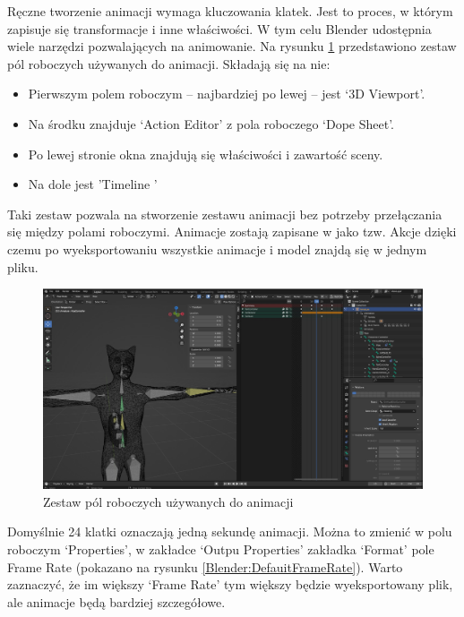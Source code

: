 \documentclass[12pt,twoside]{article}
\begin{document}
Ręczne tworzenie animacji wymaga kluczowania klatek. Jest to proces, w którym
zapisuje się transformacje i inne właściwości. W tym celu Blender udostępnia wiele narzędzi
pozwalających na animowanie. Na rysunku
\ref{Blender:DefaulAnimationWin} przedstawiono zestaw pól roboczych używanych do
animacji. Składają się na nie: 
\begin{itemize}
\item Pierwszym polem roboczym -- najbardziej po lewej --  jest `3D Viewport'. 
\item Na środku znajduje `Action Editor' z pola roboczego `Dope Sheet'.
\item Po lewej stronie okna znajdują się właściwości i zawartość sceny.
\item Na dole jest 'Timeline '
\end{itemize}
Taki zestaw pozwala na stworzenie zestawu animacji bez potrzeby przełączania się
między polami roboczymi. Animacje zostają zapisane w jako tzw. Akcje dzięki
czemu po wyeksportowaniu wszystkie animacje i model znajdą się w jednym pliku.

\begin{figure}[ht!]
    \centering
    \includegraphics[width=12cm]{BlenderPict/WindowForAnimation.jpg}
    \caption{Zestaw pól roboczych używanych do animacji}
    \label{Blender:DefaulAnimationWin}
\end{figure}


Domyślnie 24 klatki oznaczają jedną sekundę animacji. Można to zmienić w polu
roboczym `Properties', w zakładce `Outpu Properties' zakładka `Format' pole
Frame Rate (pokazano na rysunku \ref{Blender:DefauitFrameRate}). Warto
zaznaczyć, że im większy `Frame Rate' tym większy będzie wyeksportowany plik,
ale animacje będą bardziej szczegółowe. 
\end{document}
